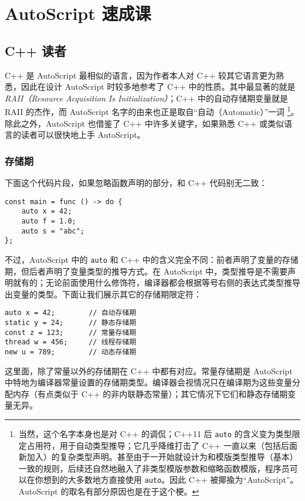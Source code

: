 \chapter{AutoScript 速成课}

\section{C++ 读者}

C++ 是 AutoScript 最相似的语言，因为作者本人对 C++ 较其它语言更为熟悉，因此在设计 AutoScript 时较多地参考了 C++ 中的性质。其中最显著的就是 \emph{RAII（Resource Acquisition Is Initialization）}；C++ 中的自动存储期变量就是 RAII 的杰作，而 AutoScript 名字的由来也正是取自“自动（Automatic）”一词 \footnote{当然，这个名字本身也是对 C++ 的调侃；C++11 后 \lstinline!auto! 的含义变为类型限定占用符，用于自动类型推导；它几乎降维打击了 C++ 一直以来（包括后面新加入）的复杂类型声明。甚至由于一开始就设计为和模版类型推导（基本）一致的规则，后续还自然地融入了非类型模版参数和缩略函数模版，程序员可以在你想到的大多数地方直接使用 \lstinline!auto!。因此 C++ 被揶揄为“AutoScript”。AutoScript 的取名有部分原因也是在于这个梗。}。除此之外，AutoScript 也借鉴了 C++ 中许多关键字，如果熟悉 C++ 或类似语言的读者可以很快地上手 AutoScript。

\subsection{存储期}

下面这个代码片段，如果忽略函数声明的部分，和 C++ 代码别无二致：

\begin{lstlisting}
const main = func () -> do {
	auto x = 42;
	auto f = 1.0;
	auto s = "abc";
};
\end{lstlisting}

不过，AutoScript 中的 \lstinline!auto! 和 C++ 中的含义完全不同：前者声明了变量的存储期，但后者声明了变量类型的推导方式。在 AutoScript 中，类型推导是不需要声明就有的；无论前面使用什么修饰符，编译器都会根据等号右侧的表达式类型推导出变量的类型。下面让我们展示其它的存储期限定符：

\begin{lstlisting}
auto x = 42;		// 自动存储期
static y = 24;		// 静态存储期
const z = 123;		// 常量存储期
thread w = 456;		// 线程存储期
new u = 789;		// 动态存储期
\end{lstlisting}

这里面，除了常量以外的存储期在 C++ 中都有对应。常量存储期是 AutoScript 中特地为编译器常量设置的存储期类型。编译器会视情况只在编译期为这些变量分配内存（有点类似于 C++ 的非内联静态常量）；其它情况下它们和静态存储期变量无异。


